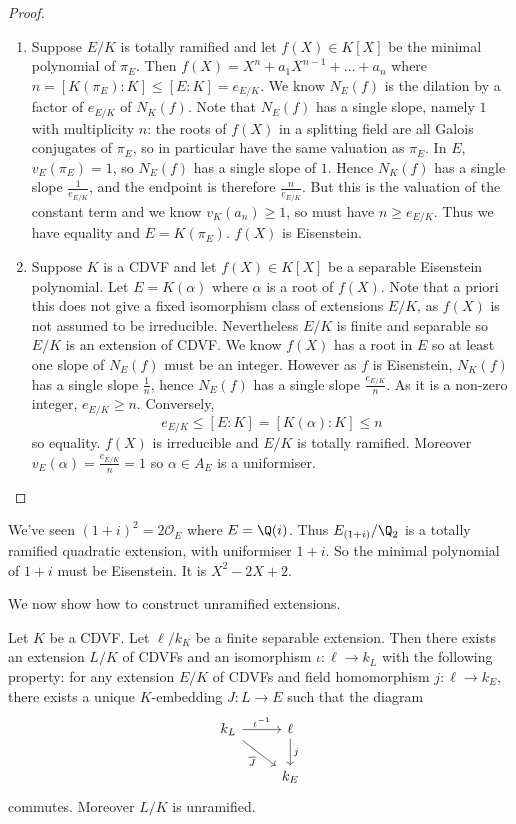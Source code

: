 \documentclass[a4paper]{article}
\renewcommand*{\O}{\mathcal{O}}
\begin{document}
\begin{proof}\leavevmode
  \begin{enumerate}
  \item Suppose \(E/K\) is totally ramified and let \(f(X) \in K[X]\) be the minimal polynomial of \(\pi_E\). Then \(f(X) = X^n + a_1 X^{n - 1} + \dots + a_n\) where \(n = [K(\pi_E): K] \leq [E: K] = e_{E/K}\). We know \(N_E(f)\) is the dilation by a factor of \(e_{E/K}\) of \(N_K(f)\). Note that \(N_E(f)\) has a single slope, namely \(1\) with multiplicity \(n\): the roots of \(f(X)\) in a splitting field are all Galois conjugates of \(\pi_E\), so in particular have the same valuation as \(\pi_E\). In \(E\), \(v_E(\pi_E) = 1\), so \(N_E(f)\) has a single slope of \(1\). Hence \(N_K(f)\) has a single slope \(\frac{1}{e_{E/K}}\), and the endpoint is therefore \(\frac{n}{e_{E/K}}\). But this is the valuation of the constant term and we know \(v_K(a_n) \geq 1\), so must have \(n \geq e_{E/K}\). Thus we have equality and \(E = K(\pi_E)\). \(f(X)\) is Eisenstein.
  \item Suppose \(K\) is a CDVF and let \(f(X) \in K[X]\) be a separable Eisenstein polynomial. Let \(E = K(\alpha)\) where \(\alpha\) is a root of \(f(X)\). Note that a priori this does not give a fixed isomorphism class of extensions \(E/K\), as \(f(X)\) is not assumed to be irreducible. Nevertheless \(E/K\) is finite and separable so \(E/K\) is an extension of CDVF. We know \(f(X)\) has a root in \(E\) so at least one slope of \(N_E(f)\) must be an integer. However as \(f\) is Eisenstein, \(N_K(f)\) has a single slope \(\frac{1}{n}\), hence \(N_E(f)\) has a single slope \(\frac{e_{E/K}}{n}\). As it is a non-zero integer, \(e_{E/K} \geq n\). Conversely,
    \[
      e_{E/K} \leq [E: K] = [K(\alpha): K] \leq n
    \]
    so equality. \(f(X)\) is irreducible and \(E/K\) is totally ramified. Moreover \(v_E(\alpha) = \frac{e_{E/K}}{n} = 1\) so \(\alpha \in A_E\) is a uniformiser.
  \end{enumerate}
\end{proof}

\begin{eg}
  We've seen \((1 + i)^2 = 2 \O_E\) where \(E = \Q(i)\). Thus \(E_{(1 + i)}/\Q_2\) is a totally ramified quadratic extension, with uniformiser \(1 + i\). So the minimal polynomial of \(1 + i\) must be Eisenstein. It is \(X^2 - 2X + 2\).
\end{eg}

We now show how to construct unramified extensions.

\begin{proposition}
  Let \(K\) be a CDVF. Let \(\ell/k_K\) be a finite separable extension. Then there exists an extension \(L/K\) of CDVFs and an isomorphism \(\iota: \ell \to k_L\) with the following property: for any extension \(E/K\) of CDVFs and field homomorphism \(j: \ell \to k_E\), there exists a unique \(K\)-embedding \(J: L \to E\) such that the diagram
  \[
    \begin{tikzcd}
      k_L \ar[r, "\iota^{-1}"] \ar[dr, "\overline J"'] & \ell \ar[d, "j"] \\
      & k_E
    \end{tikzcd}
  \]
  commutes. Moreover \(L/K\) is unramified.
\end{proposition}
\end{document}
